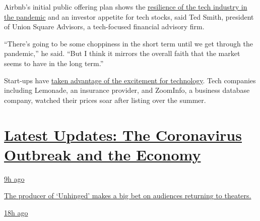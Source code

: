 Airbnb's initial public offering plan shows the
\href{https://www.nytimes3xbfgragh.onion/2020/08/19/technology/big-tech-business-domination.html?action=click\&module=Top\%20Stories\&pgtype=Homepage}{resilience
of the tech industry in the pandemic} and an investor appetite for tech
stocks, said Ted Smith, president of Union Square Advisors, a
tech-focused financial advisory firm.

``There's going to be some choppiness in the short term until we get
through the pandemic,'' he said. ``But I think it mirrors the overall
faith that the market seems to have in the long term.''

Start-ups have
\href{https://www.nytimes3xbfgragh.onion/2020/06/17/technology/ipo-pandemic.html}{taken
advantage of the excitement for technology}. Tech companies including
Lemonade, an insurance provider, and ZoomInfo, a business database
company, watched their prices soar after listing over the summer.

\hypertarget{latest-updates-the-coronavirus-outbreak-and-the-economy}{%
\section{\texorpdfstring{\href{https://www.nytimes3xbfgragh.onion/live/2020/08/20/business/stock-market-today-coronavirus?action=click\&pgtype=Article\&state=default\&region=MAIN_CONTENT_1\&context=storylines_live_updates}{Latest
Updates: The Coronavirus Outbreak and the
Economy}}{Latest Updates: The Coronavirus Outbreak and the Economy}}\label{latest-updates-the-coronavirus-outbreak-and-the-economy}}

\href{https://www.nytimes3xbfgragh.onion/live/2020/08/20/business/stock-market-today-coronavirus?action=click\&pgtype=Article\&state=default\&region=MAIN_CONTENT_1\&context=storylines_live_updates\#the-producer-of-unhinged-makes-a-big-bet-on-audiences-returning-to-theaters}{9h
ago}

\href{https://www.nytimes3xbfgragh.onion/live/2020/08/20/business/stock-market-today-coronavirus?action=click\&pgtype=Article\&state=default\&region=MAIN_CONTENT_1\&context=storylines_live_updates\#the-producer-of-unhinged-makes-a-big-bet-on-audiences-returning-to-theaters}{The
producer of `Unhinged' makes a big bet on audiences returning to
theaters.}

\href{https://www.nytimes3xbfgragh.onion/live/2020/08/20/business/stock-market-today-coronavirus?action=click\&pgtype=Article\&state=default\&region=MAIN_CONTENT_1\&context=storylines_live_updates\#american-airlines-to-stop-flights-to-15-cities-after-government-aid-ends}{18h
ago}

